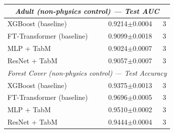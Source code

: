 \begin{table}[t]
\begin{tabular}{l c c}
\midrule
\multicolumn{3}{c}{\emph{Adult (non-physics control) — Test AUC}} \\
\midrule
XGBoost (baseline) & 0.9214{\tiny$\pm$0.0004} & 3 \\
FT-Transformer (baseline) & 0.9099{\tiny$\pm$0.0018} & 3 \\
MLP + TabM & 0.9024{\tiny$\pm$0.0007} & 3 \\
ResNet + TabM & 0.9057{\tiny$\pm$0.0007} & 3 \\
\midrule
\multicolumn{3}{c}{\emph{Forest Cover (non-physics control) — Test Accuracy}} \\
\midrule
XGBoost (baseline) & 0.9375{\tiny$\pm$0.0013} & 3 \\
FT-Transformer (baseline) & 0.9696{\tiny$\pm$0.0005} & 3 \\
MLP + TabM & 0.9510{\tiny$\pm$0.0002} & 3 \\
ResNet + TabM & 0.9444{\tiny$\pm$0.0004} & 3 \\
\bottomrule
\end{tabular}
\end{table}
